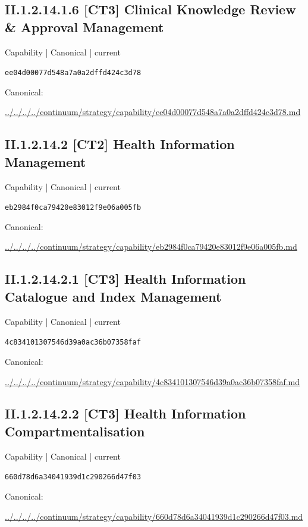 \documentclass[10pt,a4paper]{article}
\begin{document}
\subsection*{II.1.2.14.1.6 [CT3] Clinical Knowledge Review \& Approval Management}
{\small Capability | Canonical | current}\par
\texttt{ee04d00077d548a7a0a2dffd424c3d78}\par
Canonical: \par
{\footnotesize\url{../../../../continuum/strategy/capability/ee04d00077d548a7a0a2dffd424c3d78.md}}\par
\subsection*{II.1.2.14.2 [CT2] Health Information Management}
{\small Capability | Canonical | current}\par
\texttt{eb2984f0ca79420e83012f9e06a005fb}\par
Canonical: \par
{\footnotesize\url{../../../../continuum/strategy/capability/eb2984f0ca79420e83012f9e06a005fb.md}}\par
\subsection*{II.1.2.14.2.1 [CT3] Health Information Catalogue and Index Management}
{\small Capability | Canonical | current}\par
\texttt{4c834101307546d39a0ac36b07358faf}\par
Canonical: \par
{\footnotesize\url{../../../../continuum/strategy/capability/4c834101307546d39a0ac36b07358faf.md}}\par
\subsection*{II.1.2.14.2.2 [CT3] Health Information Compartmentalisation}
{\small Capability | Canonical | current}\par
\texttt{660d78d6a34041939d1c290266d47f03}\par
Canonical: \par
{\footnotesize\url{../../../../continuum/strategy/capability/660d78d6a34041939d1c290266d47f03.md}}\par
\end{document}
